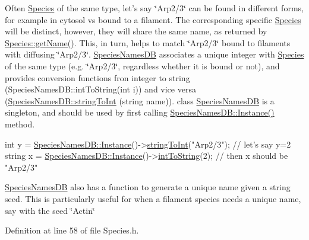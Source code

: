Often \hyperlink{classSpecies}{Species} of the same type, let's say \char`\"{}\+Arp2/3\char`\"{} can be found in different forms, for example in cytosol vs bound to a filament. The corresponding specific \hyperlink{classSpecies}{Species} will be distinct, however, they will share the same name, as returned by \hyperlink{classSpecies_a28fa239dded841133760ff9c47af63a1}{Species\+::get\+Name()}. This, in turn, helps to match \char`\"{}\+Arp2/3\char`\"{} bound to filaments with diffusing \char`\"{}\+Arp2/3\char`\"{}. \hyperlink{classSpeciesNamesDB}{Species\+Names\+D\+B} associates a unique integer with \hyperlink{classSpecies}{Species} of the same type (e.\+g. \char`\"{}\+Arp2/3\char`\"{}, regardless whether it is bound or not), and provides conversion functions fron integer to string (Species\+Names\+D\+B\+::int\+To\+String(int i)) and vice versa (\hyperlink{classSpeciesNamesDB_acc0a62d3f071e1c3fd85ae3d7565c381}{Species\+Names\+D\+B\+::string\+To\+Int} (string name)). class \hyperlink{classSpeciesNamesDB}{Species\+Names\+D\+B} is a singleton, and should be used by first calling \hyperlink{classSpeciesNamesDB_a845e8c31528ebce2177f916ef6018614}{Species\+Names\+D\+B\+::\+Instance()} method.


\begin{DoxyCode}
\textcolor{keywordtype}{int} y = \hyperlink{classSpeciesNamesDB_a845e8c31528ebce2177f916ef6018614}{SpeciesNamesDB::Instance}()->\hyperlink{classSpeciesNamesDB_acc0a62d3f071e1c3fd85ae3d7565c381}{stringToInt}(\textcolor{stringliteral}{"Arp2/3"}); \textcolor{comment}{// let's say
       y=2}
\textcolor{keywordtype}{string} x = \hyperlink{classSpeciesNamesDB_a845e8c31528ebce2177f916ef6018614}{SpeciesNamesDB::Instance}()->\hyperlink{classSpeciesNamesDB_ac2cc60cba624407d270e0de80c6f20fe}{intToString}(2); \textcolor{comment}{// then x should
       be "Arp2/3"}
\end{DoxyCode}


\hyperlink{classSpeciesNamesDB}{Species\+Names\+D\+B} also has a function to generate a unique name given a string seed. This is particularly useful for when a filament species needs a unique name, say with the seed \char`\"{}\+Actin\char`\"{} 

Definition at line 58 of file Species.\+h.




